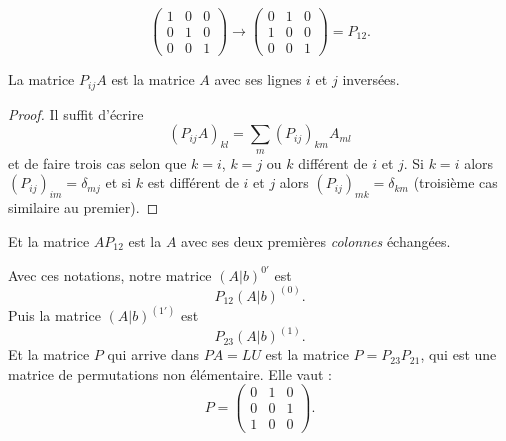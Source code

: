 \begin{example}
    \begin{equation}
        \begin{pmatrix}
            1    &   0    &   0    \\
            0    &   1    &   0    \\
            0    &   0    &   1
        \end{pmatrix}\to
        \begin{pmatrix}
            0    &   1    &   0    \\
            1    &   0    &   0    \\
            0    &   0    &   1
        \end{pmatrix}=P_{12}.
    \end{equation}
\end{example}

\begin{lemma}
    La matrice \( P_{ij}A\) est la matrice \( A\) avec ses lignes \( i\) et \( j\) inversées.
\end{lemma}

\begin{proof}
    Il suffit d'écrire
    \begin{equation}
        (P_{ij}A)_{kl}=\sum_m(P_{ij})_{km}A_{ml}
    \end{equation}
    et de faire trois cas selon que \( k=i\), \( k=j\) ou \( k\) différent de \( i\) et \( j\). Si \( k=i\) alors \( (P_{ij})_{im}=\delta_{mj}\) et si \( k\) est différent de \( i\) et \( j\) alors \( (P_{ij})_{mk}=\delta_{km}\) (troisième cas similaire au premier).
\end{proof}

Et la matrice \( AP_{12}\) est la \( A\) avec ses deux premières \emph{colonnes} échangées.

Avec ces notations, notre matrice \( (A|b)^{0'}\) est
\begin{equation}
    P_{12}(A|b)^{(0)}.
\end{equation}
Puis la matrice \( (A|b)^{(1')}\) est
\begin{equation}
    P_{23}(A|b)^{(1)}.
\end{equation}
Et la matrice \( P\) qui arrive dans \( PA=LU\) est la matrice \(P= P_{23}P_{21}\), qui est une matrice de permutations non élémentaire. Elle vaut :
\begin{equation}
    P=\begin{pmatrix}
        0    &   1    &   0    \\
        0    &   0    &   1    \\
        1    &   0    &   0
    \end{pmatrix}.
\end{equation}

